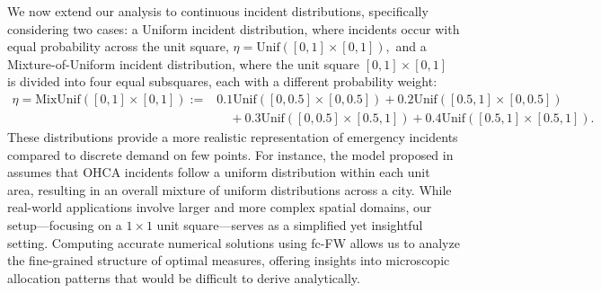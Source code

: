 \documentclass[stsy,sglanonrev]{informs4}
\begin{document}
We now extend our analysis to continuous incident distributions, specifically considering two cases: a Uniform incident distribution, where incidents occur with equal probability across the unit square, $\eta = \text{Unif}([0,1] \times [0,1]),$
and a Mixture-of-Uniform incident distribution, where the unit square \([0,1] \times [0,1]\) is divided into four equal subsquares, each with a different probability weight: \begin{align*}\eta = \text{MixUnif}([0,1] \times [0,1]) :=& 0.1 \text{Unif}([0,0.5] \times [0,0.5]) + 0.2 \text{Unif}([0.5,1] \times [0,0.5]) \\ 
    &\quad + 0.3 \text{Unif}([0,0.5] \times [0.5,1]) + 0.4 \text{Unif}([0.5,1] \times [0.5,1]).\end{align*}
These distributions provide a more realistic representation of emergency incidents compared to discrete demand on few points. For instance, the model proposed in~\cite{van2024modeling} assumes that OHCA incidents follow a uniform distribution within each unit area, resulting in an overall mixture of uniform distributions across a city. While real-world applications involve larger and more complex spatial domains, our setup—focusing on a \( 1 \times 1 \) unit square—serves as a simplified yet insightful setting. Computing accurate numerical solutions using fc-FW allows us to analyze the fine-grained structure of optimal measures, offering insights into microscopic allocation patterns that would be difficult to derive analytically.
\end{document}
